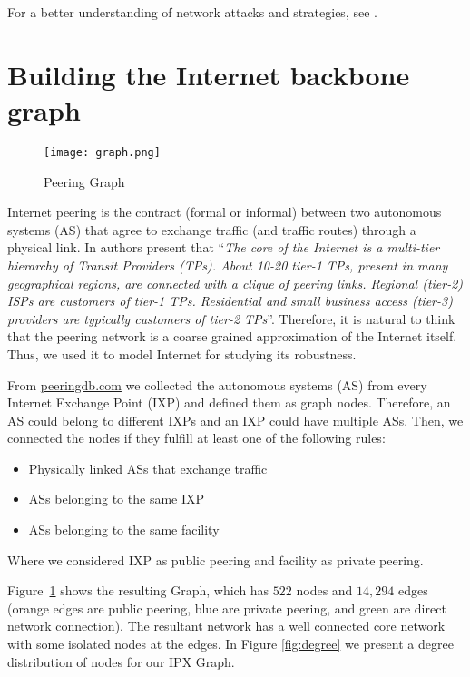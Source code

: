 \documentclass{sig-alternate-10pt}
\begin{document}
For a better understanding of network attacks and strategies, see  \cite{holme2002attack,molisz2006end,rak2010survivability, sydney2010characterising}. 

\section{Building the Internet backbone graph}
\label{graph}

\begin{figure}[ht!]
  \centering
  \texttt{[image: graph.png]}
  \caption{Peering Graph}
  \label{fig:graph}
\end{figure}

Internet peering is the contract (formal or informal) between two autonomous systems (AS) that agree to exchange traffic (and traffic routes) through a physical link. In \cite{Dhamdhere:2010:IFM:1921168.1921196} authors present that ``\textit{The core of the Internet is a multi-tier hierarchy of Transit Providers (TPs). About 10-20 tier-1 TPs, present in many geographical regions, are connected with a clique of peering links. Regional (tier-2) ISPs are customers of tier-1 TPs. Residential and small business access (tier-3) providers are typically customers of tier-2 TPs}''. Therefore, it is natural to think that the peering network is a coarse grained approximation of the Internet itself.  Thus, we used it to model Internet for studying its robustness.

From \url{peeringdb.com} we collected the autonomous systems (AS) from every Internet Exchange Point (IXP) and defined them as graph nodes. Therefore, an AS could belong to different IXPs and an IXP could have multiple ASs. Then, we connected the nodes if they fulfill at least one of the following rules:
\begin{itemize}
\item Physically linked ASs that exchange traffic 
\item ASs belonging to the same IXP
\item ASs belonging to the same facility
\end{itemize}
Where we considered IXP as public peering and facility as private peering.

Figure~\ref{fig:graph} shows the resulting Graph, which has $522$ nodes and $14,294$ edges  (orange edges are public peering, blue are private peering, and green are direct network connection). The resultant network has a well connected core network with some isolated nodes at the edges. In Figure \ref{fig:degree} we present a degree distribution of nodes for our IPX Graph.
\end{document}
